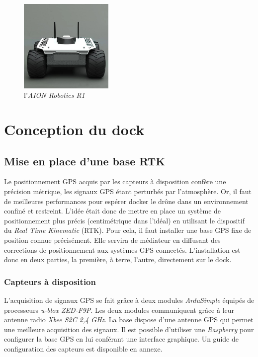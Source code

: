 \documentclass[12pt]{report}
\begin{document}
\begin{figure}[H]
    \centering
    \includegraphics[width=0.4\textwidth]{imgs/rover.jpg}
    \caption{l'\textit{AION Robotics R1}}
    \label{fig:rover}
\end{figure}

\chapter{Conception du dock}
\section{Mise en place d'une base RTK}
Le positionnement GPS acquis par les capteurs à disposition confère une précision métrique, les signaux GPS étant perturbés par l'atmosphère. Or, il faut de meilleures performances pour espérer docker le drône dans un environnement confiné et restreint. 
L'idée était donc de mettre en place un système de positionnement plus précis (centimétrique dans l'idéal) en  utilisant le dispositif du \textit{Real Time Kinematic} (RTK).
Pour cela, il faut installer une base GPS fixe de position connue précisément. Elle servira de médiateur en diffusant des corrections de positionnement aux systèmes GPS connectés.
L'installation est donc en deux parties, la première, à terre, l'autre, directement sur le dock.
\subsection{Capteurs à disposition}
L'acquisition de signaux GPS se fait grâce à deux modules \textit{ArduSimple} équipés de processeurs \textit{u-blox ZED-F9P}. 
Les deux modules communiquent grâce à leur antenne radio \textit{Xbee S2C 2,4 GHz}. La base dispose d'une antenne GPS qui permet une meilleure acquisition des signaux. 
Il est possible d'utiliser une \textit{Raspberry} pour configurer la base GPS en lui conférant une interface graphique. Un guide de configuration des capteurs est disponible en annexe.
\end{document}
